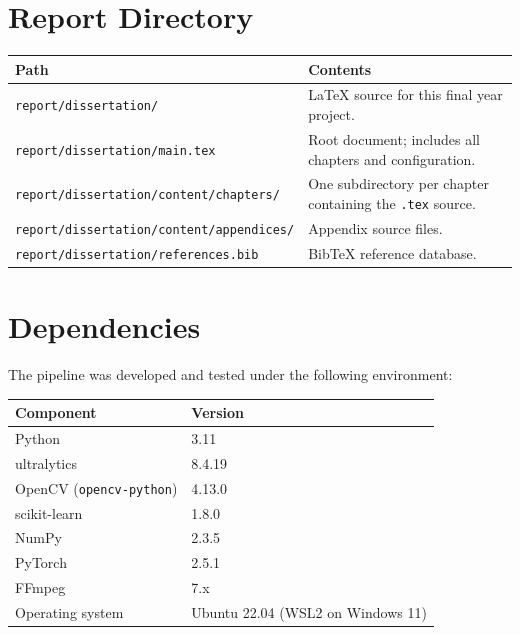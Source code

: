 \section*{Report Directory}

\begin{tabularx}{\linewidth}{lX}
\hline
Path & Contents \\
\hline
\texttt{report/dissertation/} & LaTeX source for this final year project. \\
\texttt{report/dissertation/main.tex} & Root document; includes all chapters and configuration. \\
\texttt{report/dissertation/content/chapters/} & One subdirectory per chapter containing the \texttt{.tex} source. \\
\texttt{report/dissertation/content/appendices/} & Appendix source files. \\
\texttt{report/dissertation/references.bib} & BibTeX reference database. \\
\hline
\end{tabularx}

\section*{Dependencies}

The pipeline was developed and tested under the following environment:

\begin{tabularx}{\linewidth}{lX}
\hline
Component & Version \\
\hline
Python & 3.11 \\
ultralytics & 8.4.19 \\
OpenCV (\texttt{opencv-python}) & 4.13.0 \\
scikit-learn & 1.8.0 \\
NumPy & 2.3.5 \\
PyTorch & 2.5.1 \\
FFmpeg & 7.x \\
Operating system & Ubuntu 22.04 (WSL2 on Windows 11) \\
\hline
\end{tabularx}
